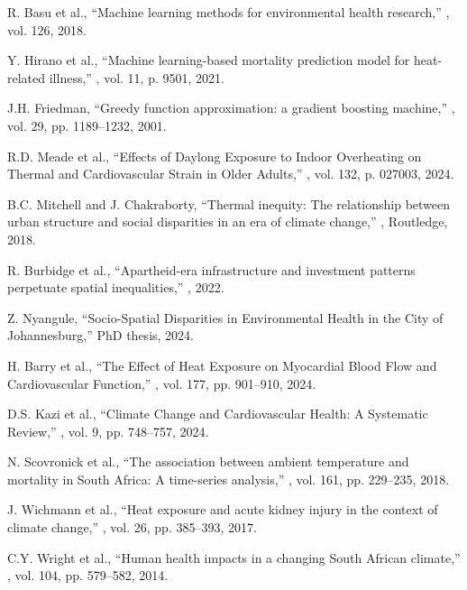 \documentclass[11pt,a4paper]{article}
\begin{document}
\begin{thebibliography}{99}
R. Basu et al.,
\newblock ``Machine learning methods for environmental health research,''
, vol. 126, 2018.

Y. Hirano et al.,
\newblock ``Machine learning-based mortality prediction model for heat-related illness,''
, vol. 11, p. 9501, 2021.

J.H. Friedman,
\newblock ``Greedy function approximation: a gradient boosting machine,''
, vol. 29, pp. 1189--1232, 2001.

R.D. Meade et al.,
\newblock ``Effects of Daylong Exposure to Indoor Overheating on Thermal and Cardiovascular Strain in Older Adults,''
, vol. 132, p. 027003, 2024.

B.C. Mitchell and J. Chakraborty,
\newblock ``Thermal inequity: The relationship between urban structure and social disparities in an era of climate change,''
, Routledge, 2018.

R. Burbidge et al.,
\newblock ``Apartheid-era infrastructure and investment patterns perpetuate spatial inequalities,''
, 2022.

Z. Nyangule,
\newblock ``Socio-Spatial Disparities in Environmental Health in the City of Johannesburg,''
\newblock PhD thesis, 2024.

H. Barry et al.,
\newblock ``The Effect of Heat Exposure on Myocardial Blood Flow and Cardiovascular Function,''
, vol. 177, pp. 901--910, 2024.

D.S. Kazi et al.,
\newblock ``Climate Change and Cardiovascular Health: A Systematic Review,''
, vol. 9, pp. 748--757, 2024.

N. Scovronick et al.,
\newblock ``The association between ambient temperature and mortality in South Africa: A time-series analysis,''
, vol. 161, pp. 229--235, 2018.

J. Wichmann et al.,
\newblock ``Heat exposure and acute kidney injury in the context of climate change,''
, vol. 26, pp. 385--393, 2017.

C.Y. Wright et al.,
\newblock ``Human health impacts in a changing South African climate,''
, vol. 104, pp. 579--582, 2014.

\end{thebibliography}
\end{document}
